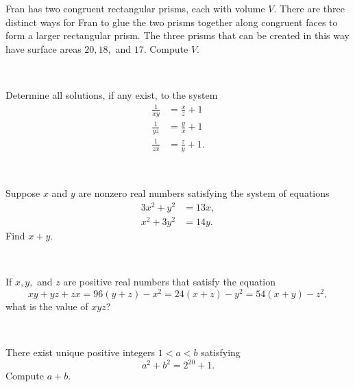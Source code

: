 \documentclass{article}
\begin{document}
\begin{prob}{5}
Fran has two congruent rectangular prisms, each with volume $V$. There are three distinct ways for Fran to glue the two prisms together along congruent faces to form a larger rectangular prism. The three prisms that can be created in this way have surface areas $20,18,$ and $17$. Compute $V$.
\end{prob}
\\

\begin{prob}[vvluo]{6}
Determine all solutions, if any exist, to the system
\begin{align*}
\frac{1}{xy}&=\frac{x}{z}+1 \\
\frac{1}{yz}&=\frac{y}{x}+1 \\
\frac{1}{zx}&=\frac{z}{y}+1.
\end{align*}
\end{prob}
\\

\begin{prob}{6}
Suppose $x$ and $y$ are nonzero real numbers satisfying the system of equations
\begin{align*}
    3x^2 + y^2 &= 13x,\\
    x^2 + 3y^2 &= 14y.
\end{align*}
Find $x+y$.
\end{prob}
\\

\begin{req}[JMC 10 2021/18]{9}
If $x,y,$ and $z$ are positive real numbers that satisfy the equation
\[xy+yz+zx=96(y+z)-x^2 = 24(x+z) -y^2 = 54(x+y) -z^2,\]
what is the value of $xyz$?
\end{req}
\\

\begin{prob}[CARML 2019/8]{13}
There exist unique positive integers $1<a<b$ satisfying
\[a^2+b^2=2^{20}+1.\]
Compute $a+b$.
\end{prob}
\end{document}
